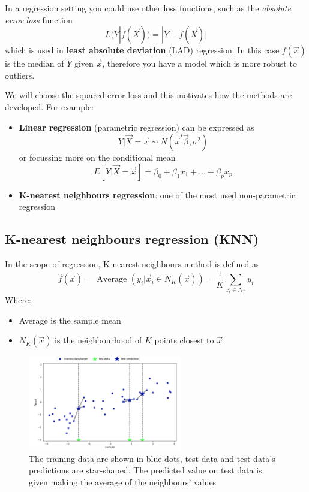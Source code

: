     In a regression setting you could use other loss functions, such as the \textit{absolute error loss} function
    $$L(Y|f(\vec{X})) = |Y - f(\vec{X})|$$
    which is used in \textbf{least absolute deviation} (LAD) regression. In this case $f(\vec{x})$ is the median of $Y$ given $\vec{x}$, therefore you have a model which is more robust to outliers.

    We will choose the squared error loss and this motivates how the methods are developed.
    For example:
    \begin{itemize}
      \item \textbf{Linear regression} (parametric regression) can be expressed as 
            $$Y|\vec{X} = \vec{x} \sim N(\vec{x}^t\vec{\beta}, \sigma^2)$$ 
            or focussing more on the conditional mean
            $$E[Y|\vec{X} = \vec{x}] = \beta_0 + \beta_1x_1 + \dots + \beta_px_p$$
      \item \textbf{K-nearest neighbours regression}: one of the most used non-parametric regression
    \end{itemize}

    \subsection{K-nearest neighbours regression (KNN)}
    
      In the scope of regression, K-nearest neighbours method is defined as
      $$\hat{f}(\vec{x}) = \text{ Average } (y_i | \vec{x}_i \in N_K(\vec{x})) = \frac{1}{K} \sum_{x_i \in N_\vec{x}} {y_i} $$ %
      Where:
      \begin{itemize}
        \item Average is the sample mean
        \item $N_K(\vec{x})$ is the neighbourhood of $K$ points closest to $\vec{x}$
      \end{itemize}

\begin{figure}[h]
\caption{The training data are shown in blue dots, test data and test data's predictions are star-shaped. The predicted value on test data is given making the average of the neighbours' values}
\centering
\includegraphics[width=0.6\textwidth]{KNNregression}
\end{figure}


